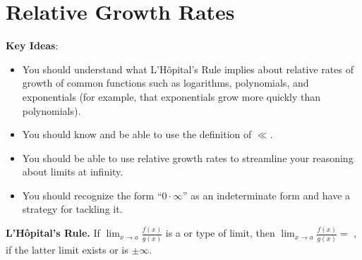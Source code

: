 \documentclass[main]{subfiles}
\begin{document}
\ifSubfilesClassLoaded{%
  \chaptermark{\chapterfour}
}{}

\section{Relative Growth Rates} \label{ws4-2}

\begin{problemonly}
    \begin{framed}

\textbf{Key Ideas}:

\begin{itemize}[topsep=0pt,partopsep=0pt,parsep=8pt,itemsep=0pt]

\item You should understand what L'H\^{o}pital's Rule implies about
  relative rates of growth of common functions such as logarithms,
  polynomials, and exponentials (for example, that exponentials grow more
  quickly than polynomials).

\item You should know and be able to use the definition of $\ll$. 

\item You should be able to use relative growth rates to streamline your
  reasoning about limits at infinity.

\item You should recognize the form ``$0\cdot\infty$'' as an indeterminate
  form and have a strategy for tackling it.

\end{itemize}
\end{framed}
\end{problemonly}

  \begin{framed}
    \textbf{L'Hôpital's Rule.}  If $\displaystyle \lim_{x \to a}
    \frac{f(x)}{g(x)}$ is a
     or
    type of limit, then $\displaystyle \lim_{x
      \to a} \frac{f(x)}{g(x)} =$
    , if the latter limit exists or is $\pm
    \infty$.
  \end{framed}
\end{document}
